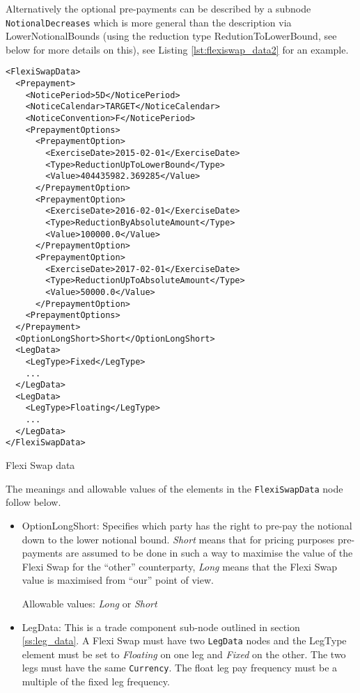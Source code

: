 Alternatively the optional pre-payments can be described by a subnode \lstinline!NotionalDecreases! which is more
general than the description via LowerNotionalBounds (using the reduction type RedutionToLowerBound, see below for more
details on this), see Listing \ref{lst:flexiswap_data2} for an example.

\begin{listing}[H]
\begin{verbatim}
<FlexiSwapData>
  <Prepayment>
    <NoticePeriod>5D</NoticePeriod>
    <NoticeCalendar>TARGET</NoticeCalendar>
    <NoticeConvention>F</NoticePeriod>
    <PrepaymentOptions>
      <PrepaymentOption>
        <ExerciseDate>2015-02-01</ExerciseDate>
        <Type>ReductionUpToLowerBound</Type>
        <Value>404435982.369285</Value>
      </PrepaymentOption>
      <PrepaymentOption>
        <ExerciseDate>2016-02-01</ExerciseDate>
        <Type>ReductionByAbsoluteAmount</Type>
        <Value>100000.0</Value>
      </PrepaymentOption>
      <PrepaymentOption>
        <ExerciseDate>2017-02-01</ExerciseDate>
        <Type>ReductionUpToAbsoluteAmount</Type>
        <Value>50000.0</Value>
      </PrepaymentOption>
    <PrepaymentOptions>
  </Prepayment>
  <OptionLongShort>Short</OptionLongShort>
  <LegData>
    <LegType>Fixed</LegType>
    ...
  </LegData>
  <LegData>
    <LegType>Floating</LegType>
    ...
  </LegData>
</FlexiSwapData>
\end{verbatim}
\caption{Flexi Swap data}
\label{lst:flexiswap_data2}
\end{listing}

The meanings and allowable values of the elements in the \lstinline!FlexiSwapData!  node follow below.

\begin{itemize}

\item OptionLongShort: Specifies which party has the right to pre-pay the notional down to the lower notional
  bound. \emph{Short} means that for pricing purposes pre-payments are assumed to be done in such a way to maximise the
  value of the Flexi Swap for the ``other'' counterparty, \emph{Long} means that the Flexi Swap value is maximised from
  ``our'' point of view.

Allowable values: \emph{Long} or \emph{Short}

\item LegData: This is a trade component sub-node outlined in section \ref{ss:leg_data}. A Flexi Swap must have two
  \lstinline!LegData! nodes and the LegType element must be set to \emph{Floating} on one leg and \emph{Fixed} on the
  other. The two legs must have the same \lstinline!Currency!. The float leg pay frequency must be a multiple of the
  fixed leg frequency.

\end{itemize}


